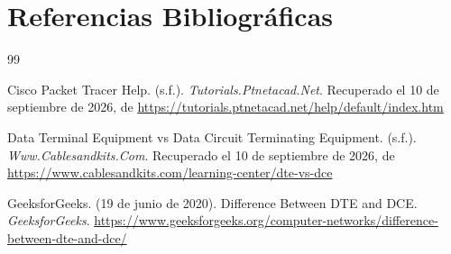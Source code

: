 \section{Referencias Bibliográficas}

\begin{thebibliography}{99}

Cisco Packet Tracer Help. (s.f.). \textit{Tutorials.Ptnetacad.Net}. Recuperado el 10 de septiembre de 2026, de \url{https://tutorials.ptnetacad.net/help/default/index.htm}

Data Terminal Equipment vs Data Circuit Terminating Equipment. (s.f.). \textit{Www.Cablesandkits.Com}. Recuperado el 10 de septiembre de 2026, de \url{https://www.cablesandkits.com/learning-center/dte-vs-dce}

GeeksforGeeks. (19 de junio de 2020). Difference Between DTE and DCE. \textit{GeeksforGeeks}. \url{https://www.geeksforgeeks.org/computer-networks/difference-between-dte-and-dce/}
\end{thebibliography}